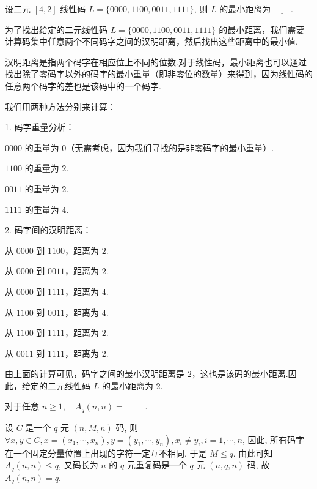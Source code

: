  \begin{tcolorbox}[breakable,colback=blue!5!white,colframe=blue!75!black,
 title= 填空题]

设二元 $ [4,2] $ 线性码 $ L=\{0000,1100,0011,1111\} $, 则 $ L $ 的最小距离为 $\underline{\hspace{2em}}$.

 \tcblower
为了找出给定的二元线性码 \( L = \{0000, 1100, 0011, 1111\} \) 的最小距离，我们需要计算码集中任意两个不同码字之间的汉明距离，然后找出这些距离中的最小值.

汉明距离是指两个码字在相应位上不同的位数.对于线性码，最小距离也可以通过找出除了零码字以外的码字的最小重量（即非零位的数量）来得到，因为线性码的任意两个码字的差也是该码中的一个码字.

我们用两种方法分别来计算：

1. 码字重量分析：

   \( 0000 \) 的重量为 \( 0 \)（无需考虑，因为我们寻找的是非零码字的最小重量）.
   
    \( 1100 \) 的重量为 \( 2 \).
    
    \( 0011 \) 的重量为 \( 2 \).
    
    \( 1111 \) 的重量为 \( 4 \).

2. 码字间的汉明距离：

    从 \( 0000 \) 到 \( 1100 \)，距离为 \( 2 \).
    
    从 \( 0000 \) 到 \( 0011 \)，距离为 \( 2 \).
    
    从 \( 0000 \) 到 \( 1111 \)，距离为 \( 4 \).
    
    从 \( 1100 \) 到 \( 0011 \)，距离为 \( 4 \).
    
    从 \( 1100 \) 到 \( 1111 \)，距离为 \( 2 \).
    
    从 \( 0011 \) 到 \( 1111 \)，距离为 \( 2 \).

由上面的计算可见，码字之间的最小汉明距离是 \( 2 \)，这也是该码的最小距离.因此，给定的二元线性码 \( L \) 的最小距离为 \( 2 \).
 \end{tcolorbox}


 \begin{tcolorbox}[breakable,colback=blue!5!white,colframe=blue!75!black,
 title= 填空题]

对于任意 $ n \geq 1, \quad A_{q}(n, n)= $  $\underline{\hspace{2em}}$.

 \tcblower
设 $ C $ 是一个 $ q $ 元 $ (n, M, n) $ 码, 则 $ \forall x, y \in C, x=\left(x_{1}, \cdots, x_{n}\right), y=\left(y_{1}, \cdots, y_{n}\right), x_{i} \neq y_{i}, i=  1, \cdots, n $, 因此, 所有码字在一个固定分量位置上出现的字符一定互不相同, 于是 $ M \leq q $. 由此可知 $ A_{q}(n, n) \leq q $, 又码长为 $ n $ 的 $ q $ 元重复码是一个 $ q $ 元 $ (n, q, n) $ 码, 故 $ A_{q}(n, n)=q $.
 \end{tcolorbox}


